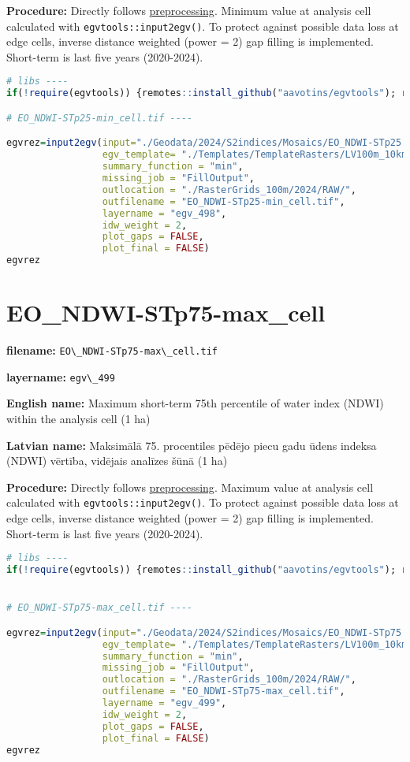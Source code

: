 \documentclass[
]{book}
\newcommand{\passthrough}[1]{#1}
\begin{document}
\textbf{Procedure:} Directly follows \hyperref[Ch04.13]{preprocessing}. Minimum value at analysis cell
calculated with \passthrough{\lstinline!egvtools::input2egv()!}. To protect against possible data loss at edge cells,
inverse distance weighted (power = 2) gap filling is implemented. Short-term is last five years (2020-2024).

\begin{lstlisting}[language=R]
# libs ----
if(!require(egvtools)) {remotes::install_github("aavotins/egvtools"); require(egvtools)}

# EO_NDWI-STp25-min_cell.tif ----

egvrez=input2egv(input="./Geodata/2024/S2indices/Mosaics/EO_NDWI-STp25.tif",
                 egv_template= "./Templates/TemplateRasters/LV100m_10km.tif",
                 summary_function = "min",
                 missing_job = "FillOutput",
                 outlocation = "./RasterGrids_100m/2024/RAW/",
                 outfilename = "EO_NDWI-STp25-min_cell.tif",
                 layername = "egv_498",
                 idw_weight = 2,
                 plot_gaps = FALSE,
                 plot_final = FALSE)
egvrez
\end{lstlisting}

\section{EO\_NDWI-STp75-max\_cell}\label{ch06.499}

\textbf{filename:} \passthrough{\lstinline!EO\_NDWI-STp75-max\_cell.tif!}

\textbf{layername:} \passthrough{\lstinline!egv\_499!}

\textbf{English name:} Maximum short-term 75th percentile of water index (NDWI) within the analysis cell (1 ha)

\textbf{Latvian name:} Maksimālā 75. procentiles pēdējo piecu gadu ūdens indeksa (NDWI) vērtība, vidējais analīzes šūnā (1 ha)

\textbf{Procedure:} Directly follows \hyperref[Ch04.13]{preprocessing}. Maximum value at analysis cell
calculated with \passthrough{\lstinline!egvtools::input2egv()!}. To protect against possible data loss at edge cells,
inverse distance weighted (power = 2) gap filling is implemented. Short-term is last five years (2020-2024).

\begin{lstlisting}[language=R]
# libs ----
if(!require(egvtools)) {remotes::install_github("aavotins/egvtools"); require(egvtools)}


# EO_NDWI-STp75-max_cell.tif ----

egvrez=input2egv(input="./Geodata/2024/S2indices/Mosaics/EO_NDWI-STp75.tif",
                 egv_template= "./Templates/TemplateRasters/LV100m_10km.tif",
                 summary_function = "min",
                 missing_job = "FillOutput",
                 outlocation = "./RasterGrids_100m/2024/RAW/",
                 outfilename = "EO_NDWI-STp75-max_cell.tif",
                 layername = "egv_499",
                 idw_weight = 2,
                 plot_gaps = FALSE,
                 plot_final = FALSE)
egvrez
\end{lstlisting}
\end{document}
